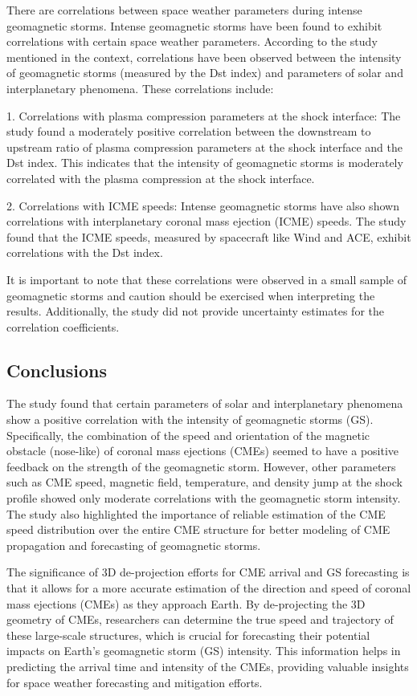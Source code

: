 There are correlations between space weather parameters during intense geomagnetic storms. Intense geomagnetic storms have been found to exhibit correlations with certain space weather parameters. According to the study mentioned in the context, correlations have been observed between the intensity of geomagnetic storms (measured by the Dst index) and parameters of solar and interplanetary phenomena. These correlations include:

1. Correlations with plasma compression parameters at the shock interface: The study found a moderately positive correlation between the downstream to upstream ratio of plasma compression parameters at the shock interface and the Dst index. This indicates that the intensity of geomagnetic storms is moderately correlated with the plasma compression at the shock interface.

2. Correlations with ICME speeds: Intense geomagnetic storms have also shown correlations with interplanetary coronal mass ejection (ICME) speeds. The study found that the ICME speeds, measured by spacecraft like Wind and ACE, exhibit correlations with the Dst index.

It is important to note that these correlations were observed in a small sample of geomagnetic storms and caution should be exercised when interpreting the results. Additionally, the study did not provide uncertainty estimates for the correlation coefficients.

\subsection{Conclusions}
The study found that certain parameters of solar and interplanetary phenomena show a positive correlation with the intensity of geomagnetic storms (GS). Specifically, the combination of the speed and orientation of the magnetic obstacle (nose-like) of coronal mass ejections (CMEs) seemed to have a positive feedback on the strength of the geomagnetic storm. However, other parameters such as CME speed, magnetic field, temperature, and density jump at the shock profile showed only moderate correlations with the geomagnetic storm intensity. The study also highlighted the importance of reliable estimation of the CME speed distribution over the entire CME structure for better modeling of CME propagation and forecasting of geomagnetic storms.

The significance of 3D de-projection efforts for CME arrival and GS forecasting is that it allows for a more accurate estimation of the direction and speed of coronal mass ejections (CMEs) as they approach Earth. By de-projecting the 3D geometry of CMEs, researchers can determine the true speed and trajectory of these large-scale structures, which is crucial for forecasting their potential impacts on Earth's geomagnetic storm (GS) intensity. This information helps in predicting the arrival time and intensity of the CMEs, providing valuable insights for space weather forecasting and mitigation efforts.

